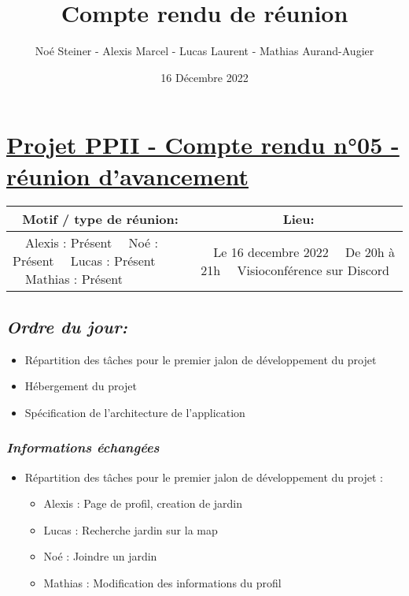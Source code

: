 \documentclass[french,a4paper]{article}
\author{Noé Steiner - Alexis Marcel - Lucas Laurent - Mathias Aurand-Augier}
\date{16 Décembre 2022}
\newcommand{\tabitem}{\textbullet~~}\title{Compte rendu de réunion}
\begin{document}
\maketitle

\section*{\underline{Projet PPII - Compte rendu n°05 - réunion d'avancement}}

\begin{table}[!htb]
  \centering
  \begin{tabular}{| p{7cm} | p{7cm} |}
    \hline
    \multicolumn{1}{|c|}{ Motif / type de réunion:} & \multicolumn{1}{c|}{Lieu:} \\
    \hline
    \tabitem Alexis : Présent\newline
    \tabitem Noé : Présent\newline
    \tabitem Lucas : Présent\newline
    \tabitem Mathias : Présent                      &
    \tabitem Le 16 decembre 2022\newline
    \tabitem De 20h à 21h\newline
    \tabitem Visioconférence sur Discord                                         \\
    \hline
  \end{tabular}
\end{table}

\subsection*{\textit{Ordre du jour:}}

\begin{itemize}
  \item Répartition des tâches pour le premier jalon de développement du projet
  \item Hébergement du projet
  \item Spécification de l'architecture de l'application
\end{itemize}

\subsubsection*{\textit{Informations échangées}}
\begin{itemize}
  \item Répartition des tâches pour le premier jalon de développement du projet :
    \begin{itemize}
      \item Alexis : Page de profil, creation de jardin
      \item Lucas : Recherche jardin sur la map
      \item Noé : Joindre un jardin
      \item Mathias : Modification des informations du profil
    \end{itemize}
\end{itemize}
\end{document}
